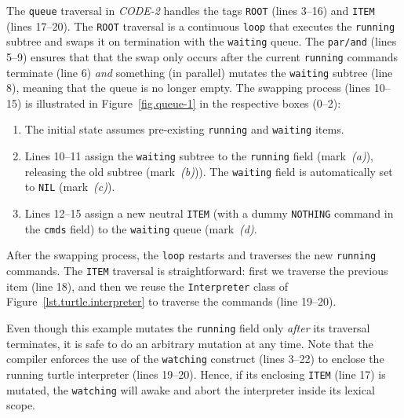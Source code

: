 \documentclass{sig-alternate}
\newcommand{\code}[1] {{\small{\texttt{#1}}}}
\begin{document}
The \code{queue} traversal in \emph{CODE-2} handles the tags \code{ROOT} (lines 
3--16) and \code{ITEM} (lines 17--20).
%
The \code{ROOT} traversal is a continuous \code{loop} that executes the 
\code{running} subtree and swaps it on termination with the \code{waiting} 
queue.
The \code{par/and} (lines 5--9) ensures that that the swap only occurs after 
the current \code{running} commands terminate (line 6) \emph{and} something (in 
parallel) mutates the \code{waiting} subtree (line 8), meaning that the queue 
is no longer empty.
The swapping process (lines 10--15) is illustrated in Figure~\ref{fig.queue-1} 
in the respective boxes (0--2):
%
\begin{enumerate}[start=0]
%
\item The initial state assumes pre-existing \code{running} and \code{waiting} 
items.
\item Lines 10--11 assign the \code{waiting} subtree to the \code{running} 
field (mark~\emph{(a)}), releasing the old subtree (mark~\emph{(b)})).
The \code{waiting} field is automatically set to \code{NIL} (mark~\emph{(c)}).
%
\item Lines 12--15 assign a new neutral \code{ITEM} (with a dummy 
\code{NOTHING} command in the \code{cmds} field) to the \code{waiting} queue 
(mark~\emph{(d)}.
%
\end{enumerate}
%
After the swapping process, the \code{loop} restarts and traverses the new 
\code{running} commands.
%
The \code{ITEM} traversal is straightforward:
first we traverse the previous item (line 18), and then we reuse the 
\code{Interpreter} class of Figure~\ref{lst.turtle.interpreter} to traverse the 
commands (line 19--20).

Even though this example mutates the \code{running} field only \emph{after} its 
traversal terminates, it is safe to do an arbitrary mutation at any time.
Note that the compiler enforces the use of the \code{watching} construct (lines 
3--22) to enclose the running turtle interpreter (lines 19--20).
Hence, if its enclosing \code{ITEM} (line 17) is mutated, the \code{watching} 
will awake and abort the interpreter inside its lexical scope.
\end{document}
